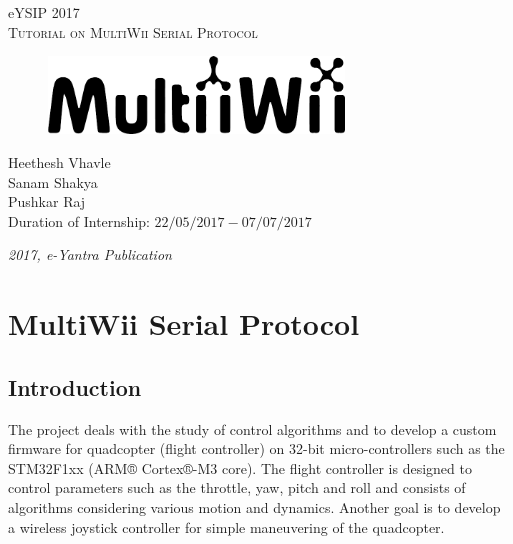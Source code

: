 \documentclass[a4paper,12pt,oneside]{book}
\begin{document}
\begin{titlepage}
\raggedright
{\Large eYSIP 2017\\[1cm]}
{\Huge \scshape Tutorial on MultiWii Serial Protocol \\[.1in]}

\vfill

\begin{figure}[!htb]
\centering
\includegraphics[width=0.7\textwidth]{images/multiwii}
\end{figure}

\vfill

\begin{flushright}
{\large Heethesh Vhavle \\}
{\large Sanam Shakya \\}
{\large Pushkar Raj \\}
\vspace{0.5cm}
{\large Duration of Internship: $ 22/05/2017-07/07/2017 $ \\}
\end{flushright}
\medskip

{\itshape 2017, e-Yantra Publication}
\end{titlepage}




\chapter[MultiWii Serial Protocol]{MultiWii Serial Protocol}
\section{Introduction}
The project deals with the study of control algorithms and to develop a custom firmware for quadcopter (flight controller) on 32-bit micro-controllers such as the STM32F1xx (ARM® Cortex®-M3 core). The flight controller is designed to control parameters such as the throttle, yaw, pitch and roll and consists of algorithms considering various motion and dynamics. Another goal is to develop a wireless joystick controller for simple maneuvering of the quadcopter.\\
\end{document}
